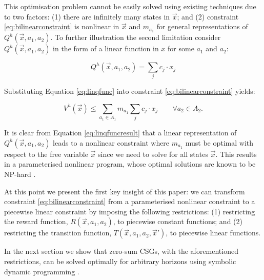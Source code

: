 This optimisation problem cannot be easily solved using existing techniques
due to two factors: (1) there are infinitely many states in $\vec{x}$; and
(2) constraint \eqref{eq:bilinearconstraint} is nonlinear in $\vec{x}$ and 
$m_{a_{1}}$ for general representations of {\small $Q^{h}(\vec{x}, a_1, a_2)$}. 
To further illustration the second limitation consider 
$Q^{h}(\vec{x}, a_1, a_2)$ in the form of a linear function in $x$ for some
$a_1$ and $a_2$:

{\small 
\begin{equation}
Q^{h}(\vec{x}, a_1, a_2) = \sum_{j} c_j \cdot x_j \label{eq:linqfunc}
\end{equation}
}%

Substituting Equation \eqref{eq:linqfunc} into constraint \eqref{eq:bilinearconstraint}
yields:

{\small 
\begin{equation}
V^{h}(\vec{x}) \leq \sum_{a_1 \in A_1} m_{a_{1}} \sum_{j} c_j \cdot x_j \qquad \forall a_2 \in A_2. \label{eq:linqfuncresult}
\end{equation}
}%

It is clear from Equation \eqref{eq:linqfuncresult} that a linear representation
of $Q^{h}(\vec{x}, a_1, a_2)$ leads to a nonlinear constraint
where $m_{a_{1}}$ must be optimal with respect to the free variable
$\vec{x}$ since we need to solve for all states $\vec{x}$. This results in 
a parameterised nonlinear program, whose optimal solutions are known to be
NP-hard \cite{Bennett_COA_1993,Petrik_JoMLR_2011}.

At this point we present the first key insight of this paper: we
can transform constraint \eqref{eq:bilinearconstraint} from a parameterised 
nonlinear constraint to a piecewise linear constraint by imposing the 
following restrictions: (1) restricting the reward function, {\small $R(\vec{x}, a_1, a_2)$}, 
to piecewise constant functions; and (2) restricting the transition function, 
{\small $T(\vec{x}, a_1, a_2, \vec{x}')$}, to piecewise linear functions.

In the next section we show that zero-sum CSGs, with the aforementioned
restrictions, can be solved optimally for arbitrary horizons using 
symbolic dynamic programming \cite{Zamani_AAAI_2012}.